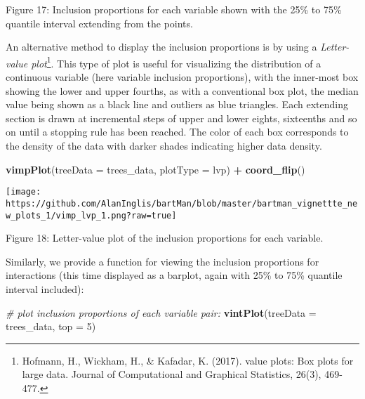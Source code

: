 \documentclass[
]{article}
\newenvironment{Shaded}{\begin{snugshade}}{\end{snugshade}}
\newcommand{\AttributeTok}[1]{\textcolor[rgb]{0.13,0.29,0.53}{#1}}
\newcommand{\CommentTok}[1]{\textcolor[rgb]{0.56,0.35,0.01}{\textit{#1}}}
\newcommand{\DecValTok}[1]{\textcolor[rgb]{0.00,0.00,0.81}{#1}}
\newcommand{\FunctionTok}[1]{\textcolor[rgb]{0.13,0.29,0.53}{\textbf{#1}}}
\newcommand{\NormalTok}[1]{#1}
\newcommand{\SpecialCharTok}[1]{\textcolor[rgb]{0.81,0.36,0.00}{\textbf{#1}}}
\newcommand{\StringTok}[1]{\textcolor[rgb]{0.31,0.60,0.02}{#1}}
\begin{document}
\protect\hypertarget{fig17:fig17}{}{Figure 17: } Inclusion proportions
for each variable shown with the 25\% to 75\% quantile interval
extending from the points.

An alternative method to display the inclusion proportions is by using a
\emph{Letter-value plot}\footnote{Hofmann, H., Wickham, H., \& Kafadar,
  K. (2017). value plots: Box plots for large data. Journal of
  Computational and Graphical Statistics, 26(3), 469-477.}. This type of
plot is useful for visualizing the distribution of a continuous variable
(here variable inclusion proportions), with the inner-most box showing
the lower and upper fourths, as with a conventional box plot, the median
value being shown as a black line and outliers as blue triangles. Each
extending section is drawn at incremental steps of upper and lower
eights, sixteenths and so on until a stopping rule has been reached. The
color of each box corresponds to the density of the data with darker
shades indicating higher data density.

\begin{Shaded}
\begin{Highlighting}[]
\FunctionTok{vimpPlot}\NormalTok{(}\AttributeTok{treeData =}\NormalTok{ trees\_data, }\AttributeTok{plotType =} \StringTok{\textquotesingle{}lvp\textquotesingle{}}\NormalTok{) }\SpecialCharTok{+} \FunctionTok{coord\_flip}\NormalTok{()}
\end{Highlighting}
\end{Shaded}

\begin{center}\texttt{[image: https://github.com/AlanInglis/bartMan/blob/master/bartman\_vignettte\_new\_plots\_1/vimp\_lvp\_1.png?raw=true]} \end{center}

\protect\hypertarget{fig18:fig18}{}{Figure 18: } Letter-value plot of
the inclusion proportions for each variable.

Similarly, we provide a function for viewing the inclusion proportions
for interactions (this time displayed as a barplot, again with 25\% to
75\% quantile interval included):

\begin{Shaded}
\begin{Highlighting}[]
\CommentTok{\# plot inclusion proportions of each variable pair:}
\FunctionTok{vintPlot}\NormalTok{(}\AttributeTok{treeData =}\NormalTok{ trees\_data, }\AttributeTok{top =} \DecValTok{5}\NormalTok{)}
\end{Highlighting}
\end{Shaded}
\end{document}
